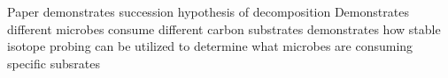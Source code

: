 
Paper demonstrates succession hypothesis of decomposition
Demonstrates different microbes consume different carbon substrates
demonstrates how stable isotope probing can be utilized to determine what microbes are consuming specific subsrates